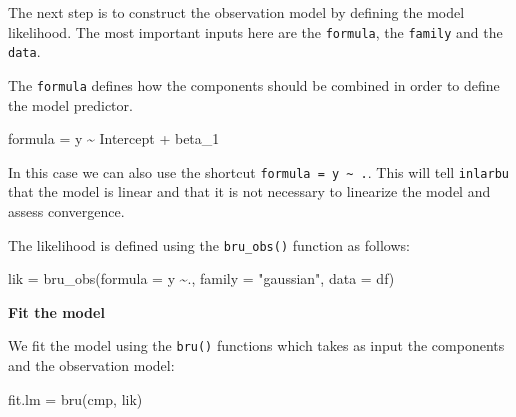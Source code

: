 \documentclass[
  letterpaper,
  DIV=11,
  numbers=noendperiod]{scrartcl}
\newenvironment{Shaded}{\begin{snugshade}}{\end{snugshade}}
\newcommand{\AttributeTok}[1]{\textcolor[rgb]{0.40,0.45,0.13}{#1}}
\newcommand{\FunctionTok}[1]{\textcolor[rgb]{0.28,0.35,0.67}{#1}}
\newcommand{\NormalTok}[1]{\textcolor[rgb]{0.00,0.23,0.31}{#1}}
\newcommand{\OtherTok}[1]{\textcolor[rgb]{0.00,0.23,0.31}{#1}}
\newcommand{\SpecialCharTok}[1]{\textcolor[rgb]{0.37,0.37,0.37}{#1}}
\newcommand{\StringTok}[1]{\textcolor[rgb]{0.13,0.47,0.30}{#1}}
\begin{document}
The next step is to construct the observation model by defining the
model likelihood. The most important inputs here are the
\texttt{formula}, the \texttt{family} and the \texttt{data}.

The \texttt{formula} defines how the components should be combined in
order to define the model predictor.

\begin{Shaded}
\begin{Highlighting}[]
\NormalTok{formula }\OtherTok{=}\NormalTok{ y }\SpecialCharTok{\textasciitilde{}}\NormalTok{ Intercept }\SpecialCharTok{+}\NormalTok{ beta\_1}
\end{Highlighting}
\end{Shaded}

\begin{tcolorbox}[enhanced jigsaw, opacitybacktitle=0.6, rightrule=.15mm, colframe=quarto-callout-note-color-frame, leftrule=.75mm, opacityback=0, colback=white, bottomtitle=1mm, arc=.35mm, coltitle=black, titlerule=0mm, breakable, toptitle=1mm, left=2mm, toprule=.15mm, bottomrule=.15mm, title=\textcolor{quarto-callout-note-color}{\faInfo}\hspace{0.5em}{Note}, colbacktitle=quarto-callout-note-color!10!white]

In this case we can also use the shortcut
\texttt{formula\ =\ y\ \textasciitilde{}\ .}. This will tell
\texttt{inlarbu} that the model is linear and that it is not necessary
to linearize the model and assess convergence.

\end{tcolorbox}

The likelihood is defined using the \texttt{bru\_obs()} function as
follows:

\begin{Shaded}
\begin{Highlighting}[]
\NormalTok{lik }\OtherTok{=}  \FunctionTok{bru\_obs}\NormalTok{(}\AttributeTok{formula =}\NormalTok{ y }\SpecialCharTok{\textasciitilde{}}\NormalTok{.,}
            \AttributeTok{family =} \StringTok{"gaussian"}\NormalTok{,}
            \AttributeTok{data =}\NormalTok{ df)}
\end{Highlighting}
\end{Shaded}

\textbf{Fit the model}

We fit the model using the \texttt{bru()} functions which takes as input
the components and the observation model:

\begin{Shaded}
\begin{Highlighting}[]
\NormalTok{fit.lm }\OtherTok{=} \FunctionTok{bru}\NormalTok{(cmp, lik)}
\end{Highlighting}
\end{Shaded}
\end{document}
